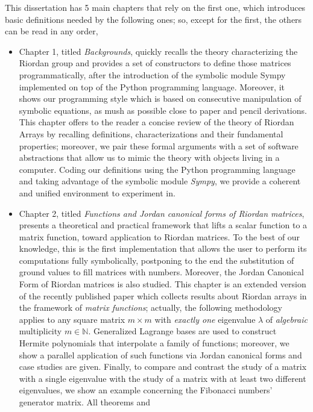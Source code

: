 \documentclass[a4paper, 10pt]{article}
\begin{document}
This dissertation has 5 main chapters that rely on the first one, which
introduces basic definitions needed by the following ones; so, except for the
first, the others can be read in any order,
\begin{itemize}
\item Chapter 1, titled \textit{Backgrounds}, quickly recalls the theory characterizing
the Riordan group and provides a set of constructors to define those matrices
programmatically, after the introduction of the symbolic module Sympy
implemented on top of the Python programming language. Moreover, it shows our
programming style which is based on consecutive manipulation of symbolic
equations, as mush as possible close to paper and pencil derivations.
This chapter offers to the reader a concise review of the theory of Riordan
Arrays by recalling definitions, characterizations and their fundamental
properties; moreover, we pair these formal arguments with a set of software
abstractions that allow us to mimic the theory with objects living in a
computer. Coding our definitions using the Python programming language and
taking advantage of the symbolic module \textit{Sympy}, we provide a coherent
and unified environment to experiment in.
\item Chapter 2, titled \textit{Functions and Jordan canonical
forms of Riordan matrices}, presents a theoretical and
practical framework that lifts a scalar function to a matrix function, toward
application to Riordan matrices. To the best of our knowledge, this is the
first implementation that allows the user to perform its computations fully
symbolically, postponing to the end the substitution of ground values to fill
matrices with numbers. Moreover, the Jordan Canonical Form of Riordan matrices
is also studied.  This chapter is an extended version of the recently published paper
\citep{MERLINI2019177} which collects results about
Riordan arrays in the framework of \textit{matrix functions};  actually,
the following methodology applies to any square matrix $m\times m$ with
\textit{exactly one} eigenvalue $\lambda$ of \textit{algebraic}
multiplicity $m \in\mathbb{N}$.  Generalized Lagrange bases are used to
construct Hermite polynomials that interpolate a family of functions;
moreover, we show a parallel application of such functions via Jordan
canonical forms and case studies are given.
Finally, to compare and contrast the study of a matrix with a single eigenvalue
with the study of a matrix with at least two different eigenvalues, we show an
example concerning the Fibonacci numbers' generator matrix.  All theorems and

\end{itemize}
\end{document}
